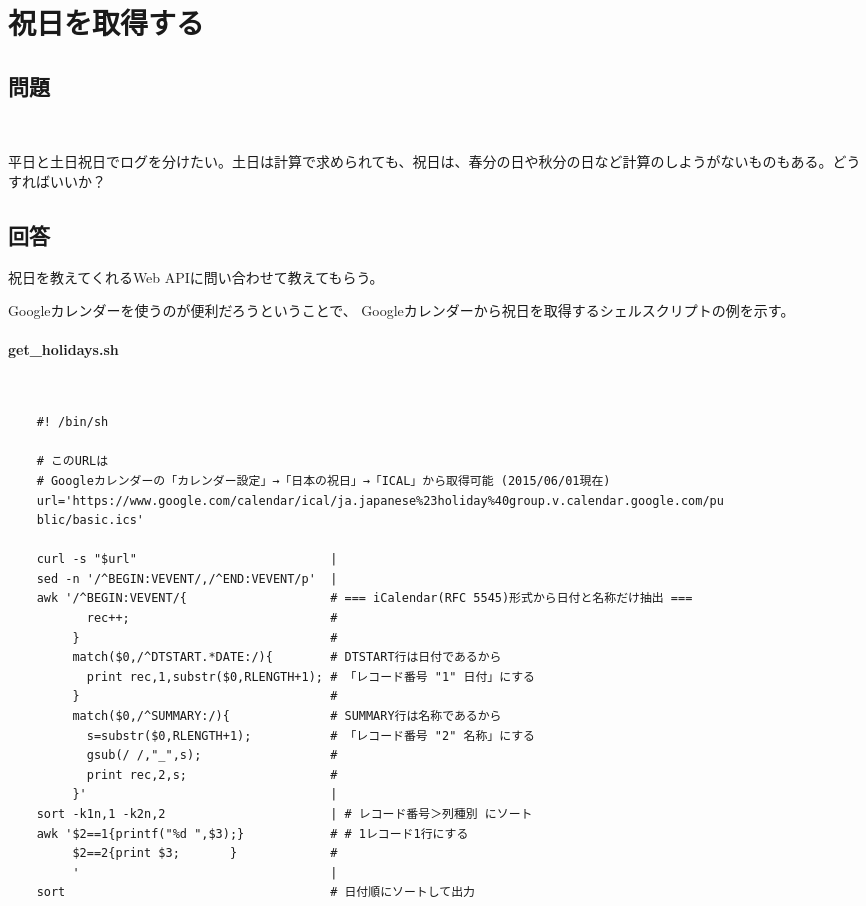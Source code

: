 \section{祝日を取得する}

\subsection*{問題}
\noindent
$\!\!\!\!\!$
\begin{grshfboxit}{160.0mm}
	平日と土日祝日でログを分けたい。土日は計算で求められても、祝日は、春分の日や秋分の日など計算のしようがないものもある。どうすればいいか？
\end{grshfboxit}

\subsection*{回答}
祝日を教えてくれるWeb APIに問い合わせて教えてもらう。

Googleカレンダーを使うのが便利だろうということで、
Googleカレンダーから祝日を取得するシェルスクリプトの例を示す。

\paragraph{get\_{}holidays.sh} 　\\
\begin{frameboxit}{160.0mm}
\begin{verbatim}
	#! /bin/sh

	# このURLは
	# Googleカレンダーの「カレンダー設定」→「日本の祝日」→「ICAL」から取得可能 (2015/06/01現在)
	url='https://www.google.com/calendar/ical/ja.japanese%23holiday%40group.v.calendar.google.com/pu
	blic/basic.ics'

	curl -s "$url"                           |
	sed -n '/^BEGIN:VEVENT/,/^END:VEVENT/p'  |
	awk '/^BEGIN:VEVENT/{                    # === iCalendar(RFC 5545)形式から日付と名称だけ抽出 ===
	       rec++;                            # 
	     }                                   #
	     match($0,/^DTSTART.*DATE:/){        # DTSTART行は日付であるから
	       print rec,1,substr($0,RLENGTH+1); # 「レコード番号 "1" 日付」にする
	     }                                   #
	     match($0,/^SUMMARY:/){              # SUMMARY行は名称であるから
	       s=substr($0,RLENGTH+1);           # 「レコード番号 "2" 名称」にする
	       gsub(/ /,"_",s);                  #
	       print rec,2,s;                    #
	     }'                                  |
	sort -k1n,1 -k2n,2                       | # レコード番号＞列種別 にソート
	awk '$2==1{printf("%d ",$3);}            # # 1レコード1行にする
	     $2==2{print $3;       }             #
	     '                                   |
	sort                                     # 日付順にソートして出力
\end{verbatim}
\end{frameboxit}

